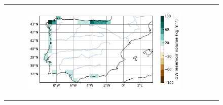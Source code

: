 \begin{figure}[htbp]
{\begin{minipage}{1.25\linewidth}
\begin{tabular}{ccc}
\begin{subfigure}[b]{0.33\linewidth}
                    \includegraphics[width=\textwidth]{images/chap3/maps/slowr_diff.png}
                \end{subfigure} \\
                

\end{tabular}
\end{minipage}}
\end{figure}

